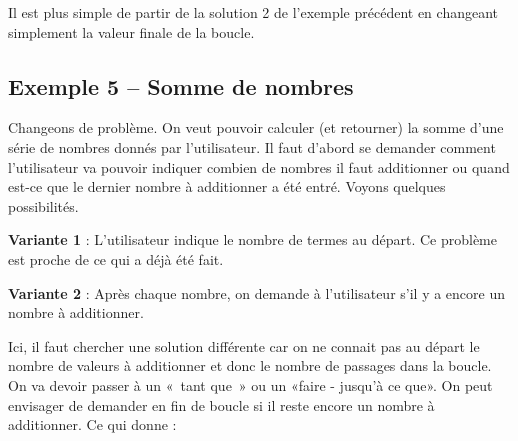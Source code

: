		Il est plus simple de partir de la solution 2 de l'exemple précédent
		en changeant simplement la valeur finale de la boucle.


	\subsection{Exemple 5 -- Somme de nombres}

		Changeons de problème. On veut pouvoir calculer (et retourner)
		la somme d'une série de nombres donnés par
		l'utilisateur. Il faut d'abord se
		demander comment l'utilisateur va pouvoir indiquer
		combien de nombres il faut additionner ou quand est-ce que le dernier
		nombre à additionner a été entré. Voyons quelques possibilités.

		\textbf{Variante 1} : 
		L'utilisateur indique le nombre de termes au départ.
		Ce problème est proche de ce qui a déjà été fait.
		

		\textbf{Variante 2} : Après chaque nombre, 
		on demande à l'utilisateur s'il y a encore un nombre à additionner.

		Ici, il faut chercher une solution différente
		car on ne connait pas au départ le nombre de valeurs à additionner et
		donc le nombre de passages dans la boucle. On va devoir passer à un
		«~tant que~» ou un «faire - jusqu'à ce que». On peut
		envisager de demander en fin de boucle si il reste
		encore un nombre à additionner. Ce qui donne :

